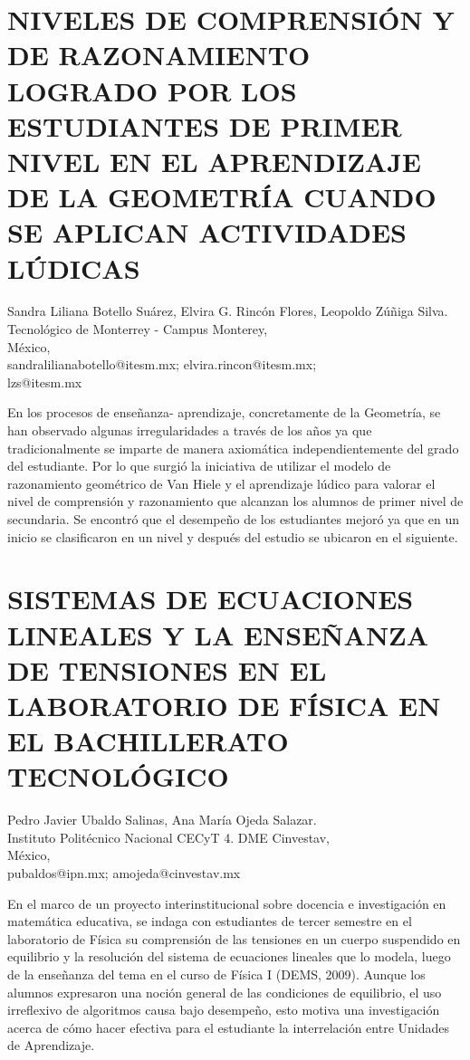 \section{NIVELES DE COMPRENSIÓN Y DE RAZONAMIENTO LOGRADO POR LOS ESTUDIANTES
DE PRIMER NIVEL EN EL APRENDIZAJE DE LA GEOMETRÍA CUANDO SE APLICAN
ACTIVIDADES LÚDICAS}

\begin{datos}
Sandra Liliana Botello Suárez, Elvira G. Rincón Flores, Leopoldo Zúñiga Silva.\\
Tecnológico de Monterrey - Campus Monterey,\\
\hfill  México, \\
\hfill sandralilianabotello@itesm.mx; elvira.rincon@itesm.mx;\\\hfill lzs@itesm.mx 
\end{datos}

En los procesos de enseñanza- aprendizaje, concretamente de la Geometría,
se han observado algunas irregularidades a través de los años ya que
tradicionalmente se imparte de manera axiomática independientemente
del grado del estudiante. Por lo que surgió la iniciativa de utilizar
el modelo de razonamiento geométrico de Van Hiele y el aprendizaje
lúdico para valorar el nivel de comprensión y razonamiento que alcanzan
los alumnos de primer nivel de secundaria. Se encontró que el desempeño
de los estudiantes mejoró ya que en un inicio se clasificaron en un
nivel y después del estudio se ubicaron en el siguiente.


\section{SISTEMAS DE ECUACIONES LINEALES Y LA ENSEÑANZA DE TENSIONES EN EL
LABORATORIO DE FÍSICA EN EL BACHILLERATO TECNOLÓGICO}

\begin{datos}
Pedro Javier Ubaldo Salinas, Ana María Ojeda Salazar.\\
Instituto Politécnico Nacional CECyT 4. DME Cinvestav,\\
\hfill  México, \\
\hfill pubaldos@ipn.mx; amojeda@cinvestav.mx 
\end{datos}

En el marco de un proyecto interinstitucional sobre docencia e investigación
en matemática educativa, se indaga con estudiantes de tercer semestre
en el laboratorio de Física su comprensión de las tensiones en un
cuerpo suspendido en equilibrio y la resolución del sistema de ecuaciones
lineales que lo modela, luego de la enseñanza del tema en el curso
de Física I (DEMS, 2009). Aunque los alumnos expresaron una noción
general de las condiciones de equilibrio, el uso irreflexivo de algoritmos
causa bajo desempeño, esto motiva una investigación acerca de cómo
hacer efectiva para el estudiante la interrelación entre Unidades
de Aprendizaje.


